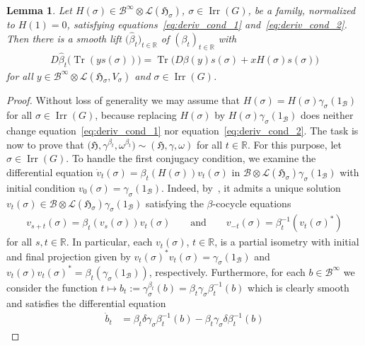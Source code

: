 \documentclass[10pt,a4paper]{amsart}
\numberwithin{equation}{section}
\newtheorem{Lemma}[Theorem]{Lemma}
\newcommand*{\R}{\mathbb R}		%
\newcommand*{\tensor}{\otimes}		%
\DeclareMathOperator{\Tr}{Tr}		%
\newcommand*{\hilb}{\mathfrak}		%
\newcommand*{\alg}{\mathcal}		%
\newcommand*{\hH}{\hilb{H}}			%
\newcommand*{\one}{1}				%
\newcommand*{\aB}{\alg{B}} 			%
\newcommand*{\End}{\mathcal{L}} %
\DeclareMathOperator{\Irrep}{Irr} 			%
\begin{document}
\begin{Lemma}\label{lem:H_to_1_param}
	Let $H(\sigma) \in \aB^\infty \tensor \End(\hH_\sigma)$, $\sigma \in \Irrep(G)$, be a family, normalized to $H(1) = 0$, satisfying equations~\eqref{eq:deriv_cond_1} and~\eqref{eq:deriv_cond_2}.
	Then there is a smooth lift $\big(\hat \beta_t\big)_{t \in \R}$ of $(\beta_t)_{t \in \R}$ with
	\begin{gather*}
		D\hat \beta_t \bigl( \Tr ( y s(\sigma) ) \bigr) = \Tr \bigl( D\beta(y) s(\sigma) + x H(\sigma) s(\sigma) \bigr)
	\end{gather*}
	for all $y \in \aB^\infty \tensor \End(\hH_\sigma, V_\sigma)$ and $\sigma \in \Irrep(G)$.
\end{Lemma}
\begin{proof}
	Without loss of generality we may assume that $H(\sigma) = H(\sigma) \gamma_\sigma(\one_\aB)$ for all $\sigma \in \Irrep(G)$, because replacing $H(\sigma)$ by $H(\sigma) \gamma_\sigma(\one_\aB)$ does neither change equation~\eqref{eq:deriv_cond_1} nor equation~\eqref{eq:deriv_cond_2}.
	The task is now to prove that $\big(\hH, \gamma^{\beta_t}, \omega^{\beta_t}\big) \sim (\hH, \gamma, \omega)$ for all $t \in \R$.
	For this purpose, let $\sigma \in \Irrep(G)$.
	To handle the first conjugacy condition, we examine the differential equation $\dot v_t(\sigma) = \beta_t ( H(\sigma) ) v_t(\sigma)$ in $\aB \tensor \End(\hH_\sigma) \gamma_\sigma(\one_\aB)$ with initial condition $v_0(\sigma) = \gamma_\sigma(\one_\aB)$.
	Indeed, by~\cite[Section~3]{daleckii02}, it admits a unique solution $v_t(\sigma) \in \aB \tensor \End(\hH_\sigma) \gamma_\sigma(\one_\aB)$ satisfying the $\beta$-cocycle equations
	\begin{gather}\label{eq:proof_1_cocycle}
		v_{s+t}(\sigma)
		= \beta_t ( v_s(\sigma) ) v_t(\sigma)
		\qquad
		\text{and}
		\qquad
		v_{-t}(\sigma)
		= \beta_t^{-1} ( v_t(\sigma)^* )
	\end{gather}
for all $s, t \in \R$.
	In particular, each $v_t(\sigma)$, $t \in \R$, is a partial isometry with initial and final projection given by $v_t(\sigma)^* v_t(\sigma) = \gamma_\sigma(\one_\aB)$ and $v_t(\sigma) v_t(\sigma)^* = \beta_t ( \gamma_\sigma(\one_\aB) )$, respectively.
	Furthermore, for each $b \in \aB^\infty$ we consider the function $t \mapsto b_t := \gamma^{\beta_t}_\sigma(b) = \beta_t\gamma_\sigma\beta_t^{-1}(b)$ which is clearly smooth and satisfies the differential equation
	\begin{align*}
		\dot b_t
		&
		= \beta_t\delta \gamma_\sigma\beta_t^{-1}(b) - \beta_t\gamma_\sigma\delta \beta_t^{-1}(b)

\end{align*}
\end{proof}
\end{document}
